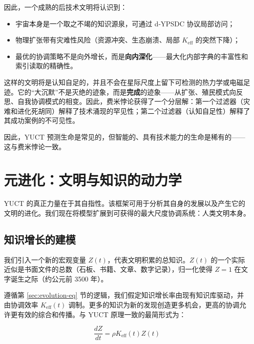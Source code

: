 \documentclass[12pt,a4paper]{article}
\theoremstyle{remark}
\begin{document}
		因此，一个成熟的后技术文明将认识到：
		\begin{itemize}[leftmargin=*]
			\item 宇宙本身是一个取之不竭的知识源泉，可通过 d‑YPSDC 协议局部访问；
			\item 物理扩张带有灾难性风险（资源冲突、生态崩溃、局部 $K_{\mathrm{eff}}$ 的突然下降）；
			\item 最优的协调策略不是向外增长，而是\textbf{向内深化}——最大化内部字典的丰富性和索引读取的精确性。
		\end{itemize}
		
		这样的文明将是认知自足的，并且不会在星际尺度上留下可检测的热力学或电磁足迹。它的“大沉默”不是灭绝的迹象，而是\textbf{完成}的迹象——从扩张、殖民模式向反思、自我协调模式的相变。因此，费米悖论获得了一个分层解：第一个过滤器（灾难和进化死胡同）解释了技术涌现的罕见性；第二个过滤器（认知自足性）解释了其成功案例的不可见性。
		
		因此，YUCT 预测生命是常见的，但智能的、具有技术能力的生命是稀有的——这与费米悖论一致。
		
		\section{元进化：文明与知识的动力学}
		\label{sec:meta-evolution}
		
		YUCT 的真正力量在于其自指性。该框架可用于分析其自身的发展以及产生它的文明的进化。我们现在将模型扩展到可获得的最大尺度协调系统：人类文明本身。
		
		\subsection{知识增长的建模}
		
		我们引入一个新的宏观变量 $Z(t)$，代表文明积累的总知识。$Z(t)$ 的一个实际近似是书面文件的总数（石板、书籍、文章、数字记录），归一化使得 $Z=1$ 在文字诞生之际（约公元前 3500 年）\cite{Buringh2009, Desai2026}。
		
		遵循第 \ref{sec:evolution-eq} 节的逻辑，我们假定知识增长率由现有知识库驱动，并由协调效率 $K_{\text{eff}}(t)$ 调制。更多的知识为新的发现创造更多机会，更高的协调允许更有效的综合和传播。与 YUCT 原理一致的最简形式为：
		
		\begin{equation}
			\frac{dZ}{dt} = \rho K_{\text{eff}}(t) Z(t)
			\label{eq:Z-growth}
		\end{equation}
		
\end{document}
